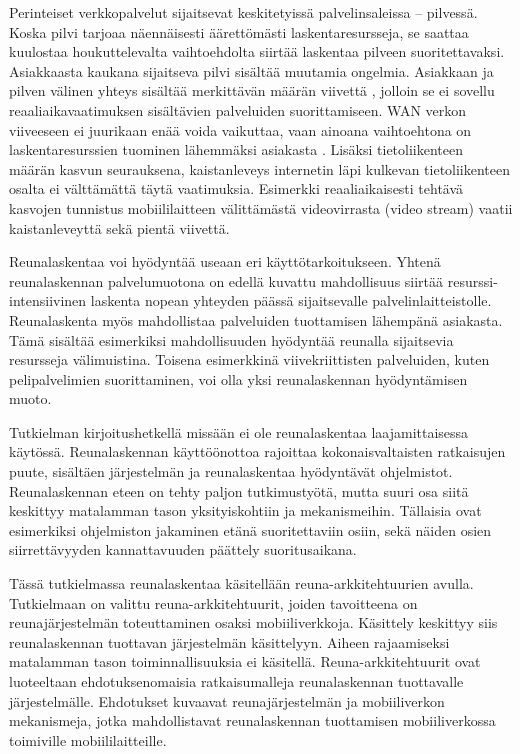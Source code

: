 Perinteiset verkkopalvelut sijaitsevat keskitetyissä palvelinsaleissa – pilvessä.
Koska pilvi tarjoaa näennäisesti äärettömästi laskentaresursseja, se saattaa kuulostaa houkuttelevalta vaihtoehdolta siirtää laskentaa pilveen suoritettavaksi.
Asiakkaasta kaukana sijaitseva pilvi sisältää muutamia ongelmia.
Asiakkaan ja pilven välinen yhteys sisältää merkittävän määrän viivettä \cite{satya09}, jolloin se ei sovellu reaaliaikavaatimuksen sisältävien palveluiden suorittamiseen.
WAN verkon viiveeseen ei juurikaan enää voida vaikuttaa, vaan ainoana vaihtoehtona on laskentaresurssien tuominen lähemmäksi asiakasta \cite{satya09}.
Lisäksi tietoliikenteen määrän kasvun seurauksena, kaistanleveys internetin läpi kulkevan tietoliikenteen osalta ei välttämättä täytä vaatimuksia. 
Esimerkki reaaliaikaisesti tehtävä kasvojen tunnistus mobiililaitteen välittämästä videovirrasta (video stream) vaatii kaistanleveyttä sekä pientä viivettä.

Reunalaskentaa voi hyödyntää useaan eri käyttötarkoitukseen.
Yhtenä reunalaskennan palvelumuotona on edellä kuvattu mahdollisuus siirtää resurssi-intensiivinen laskenta nopean yhteyden päässä sijaitsevalle palvelinlaitteistolle.
Reunalaskenta myös mahdollistaa palveluiden tuottamisen lähempänä asiakasta. Tämä sisältää esimerkiksi mahdollisuuden hyödyntää reunalla sijaitsevia resursseja välimuistina. Toisena esimerkkinä viivekriittisten palveluiden, kuten pelipalvelimien suorittaminen, voi olla yksi reunalaskennan hyödyntämisen muoto.

Tutkielman kirjoitushetkellä missään ei ole reunalaskentaa laajamittaisessa käytössä. Reunalaskennan käyttöönottoa rajoittaa kokonaisvaltaisten ratkaisujen puute, sisältäen järjestelmän ja reunalaskentaa hyödyntävät ohjelmistot.
Reunalaskennan eteen on tehty paljon tutkimustyötä, mutta suuri osa siitä keskittyy matalamman tason yksityiskohtiin ja mekanismeihin. 
Tällaisia ovat esimerkiksi ohjelmiston jakaminen etänä suoritettaviin osiin, sekä näiden osien siirrettävyyden kannattavuuden päättely suoritusaikana.


Tässä tutkielmassa reunalaskentaa käsitellään reuna-arkkitehtuurien avulla.
Tutkielmaan on valittu reuna-arkkitehtuurit, joiden tavoitteena on reunajärjestelmän toteuttaminen osaksi mobiiliverkkoja.
Käsittely keskittyy siis reunalaskennan tuottavan järjestelmän käsittelyyn.
Aiheen rajaamiseksi matalamman tason toiminnallisuuksia ei käsitellä. 
Reuna-arkkitehtuurit ovat luoteeltaan ehdotuksenomaisia ratkaisumalleja reunalaskennan tuottavalle järjestelmälle. 
Ehdotukset kuvaavat reunajärjestelmän ja mobiiliverkon mekanismeja, jotka mahdollistavat reunalaskennan tuottamisen mobiiliverkossa toimiville mobiililaitteille. 

